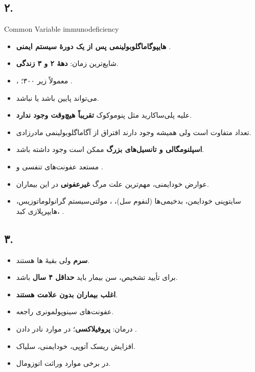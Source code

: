 \documentclass[12pt,a4paper]{article}
\begin{document}
\subsection*{۲. }
\begin{latin}
Common Variable immunodeficiency
\end{latin}
\begin{itemize}
\item \textbf{هایپوگاماگلوبولینمی پس از یک دورهٔ سیستم ایمنی }.
\item شایع‌ترین زمان: \textbf{دههٔ ۲ و ۳ زندگی}.
\item \textbf{}، معمولاً زیر ۳۰۰؛ .
\item {} می‌تواند پایین باشد یا نباشد.
\item {} علیه پلی‌ساکارید مثل پنوموکوک \LDarrow{} \textbf{تقریباً هیچ‌وقت وجود ندارد}.
\item تعداد  متفاوت است ولی همیشه وجود دارند
\LDarrow{} افتراق از آگاماگلوبولینمی مادرزادی.
\item \textbf{اسپلنومگالی و تانسیل‌های بزرگ} \LDarrow{} ممکن است وجود داشته باشد.
\item مستعد عفونت‌های تنفسی و .
\item عوارض خودایمنی، مهم‌ترین علت مرگ \textbf{غیرعفونی} در این بیماران.
\item سایتوپنی خودایمن، بدخیمی‌ها (لنفوم  سل)، ،
مولتی‌سیستم گرانولوماتوزیس، هایپرپلازی کبد، .
\end{itemize}

\subsection*{۳. }
\begin{itemize}
\item \textbf{ سرم} ولی بقیهٔ ها  هستند.
\item برای تأیید تشخیص، سن بیمار باید \textbf{حداقل ۴ سال} باشد.
\item \textbf{اغلب بیماران بدون علامت هستند}.
\item عفونت‌های سینوپولمونری راجعه.
\item درمان: \textbf{ پروفیلاکسی}؛ در موارد نادر دادن .
\item افزایش ریسک آتوپی، خودایمنی، سلیاک.
\item در برخی موارد وراثت اتوزومال.
\end{itemize}
\end{document}
